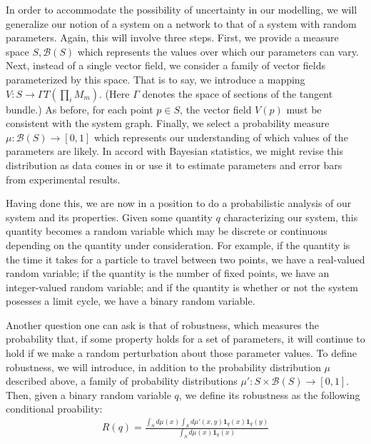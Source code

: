 
In order to accommodate the possibility of uncertainty in our modelling,
we will generalize our notion of a system on a network to that of a
system with random parameters.  Again, this will involve three
steps. First, we provide a measure space $S, \mathcal{B}(S)$ which represents the
values over which our parameters can vary. Next, instead of a single
vector field, we consider a family of vector fields parameterized by
this space. That is to say, we introduce a mapping $V \colon S \to \Gamma T(\prod_i M_m)$.
(Here $\Gamma$ denotes the space of sections of the tangent bundle.)
As before, for each point $p \in S$, the vector field $V(p)$ must be consistent with
the system graph. Finally, we select a probability measure $\mu \colon
\mathcal{B}(S) \to [0,1]$ which represents our understanding of which values of the parameters
are likely. In accord with Bayesian statistics, we might revise this
distribution as data comes in or use it to estimate parameters and error
bars from experimental results.

Having done this, we are now in a position to do a probabilistic analysis
of our system and its properties.  Given some quantity $q$ characterizing
our system, this quantity becomes a random variable which may be discrete or
continuous depending on the quantity under consideration.  For example, if
the quantity is the time it takes for a particle to travel between two points,
we have a real-valued random variable; if the quantity is the number of fixed
points, we have an integer-valued random variable; and if the quantity is
whether or not the system posesses a limit cycle, we have a binary random
variable.

Another question one can ask is that of robustness, which measures the
probability that, if some property holds for a set of parameters, it will
continue to hold if we make a random perturbation about those parameter values.
To define robustness, we will introduce, in addition to the probability
distribution $\mu$ described above, a family of probability distributions
$\mu' \colon S \times \mathcal{B}(S) \to [0,1]$.  Then, given a binary random
variable $q$, we define its robustness as the following conditional proability:
\begin{align}\label{eq:robustness}
  R (q) =
  \frac{\int_S d\mu(x) \int_S d\mu'(x,y) \mathbf{1}_q(x) \mathbf{1}_q(y)}
  {\int_S d\mu(x) \mathbf{1}_q(x)}
\end{align}

